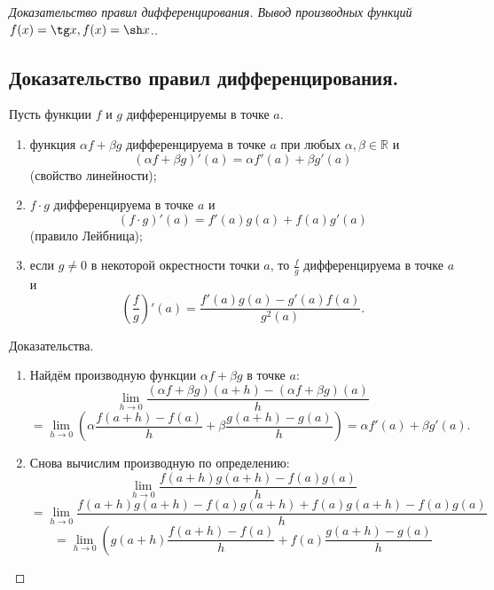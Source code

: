 
\label{sec_Proofs05}
\begin{proof}[Доказательство правил дифференцирования. Вывод производных функций $f(x) = \tg x, f(x) = \sh x$.]
    \subsection*{Доказательство правил дифференцирования.}
    \begin{note}[amber]
        Пусть функции $f$ и $g$ дифференцируемы в точке $a$.
        \begin{enumerate}[label=\arabic*)]
        \item
        функция $\alpha f + \beta g$ дифференцируема в точке $a$ при любых $\alpha, \beta \in \mathbb{R}$ и
        \[
        (\alpha f + \beta g)'(a)=\alpha f'(a)+\beta g'(a)
        \]
        (свойство линейности); \\
            \item
         $f\cdot g$ дифференцируема в точке $a$ и
        \[
        (f\cdot g)'(a)=f'(a)g(a)+f(a)g'(a)
        \]
        (правило Лейбница);
            \item
        если $g\ne 0$ в некоторой окрестности точки $a$, то $\frac{f}{g}$ дифференцируема в точке $a$ и
        \[
        \left(\frac{f}{g}\right)'(a)=\frac{f'(a)g(a)-g'(a)f(a)}{g^2(a)}.
        \]
        \end{enumerate}
        \begin{note}[purple]
            Доказательства.
            \begin{enumerate}[label=\arabic*)]
            \item 
            Найдём производную функции $\alpha f+\beta g$ в точке $a$:
            \[
            \lim_{h\to 0}\frac{(\alpha f+\beta g)(a+h)-(\alpha f+\beta g)(a)}{h}
            \]
            \[
            =\lim_{h\to 0}\left(
            \alpha\frac{f(a+h)-f(a)}{h}
            +
            \beta\frac{g(a+h)-g(a)}{h}
            \right)
            =\alpha f'(a)+\beta g'(a).
            \]
            \item 
            Снова вычислим производную по определению:
            \[
            \lim_{h\to 0}\frac{f(a+h)g(a+h)-f(a)g(a)}{h}
            \]
            \[
            =\lim_{h\to 0}\frac{f(a+h)g(a+h)-f(a)g(a+h)+f(a)g(a+h)-f(a)g(a)}{h}
            \]
            \[
            =\lim_{h\to 0}\left(
            g(a+h)\frac{f(a+h)-f(a)}{h}
            +
            f(a)\frac{g(a+h)-g(a)}{h}
\]
\end{enumerate}
\end{note}
\end{note}
\end{proof}
